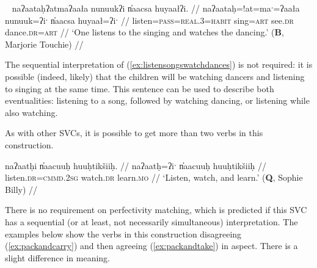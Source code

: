 \ex~ \label{ex:listensongswatchdances}
\begingl
\glpreamble naʔaataḥʔatmaʔaała nunuukʔi n̓aacsa huyaałʔi. //
\gla naʔaataḥ=!at=maˑ=ʔaała nunuuk=ʔiˑ n̓aacsa huyaał=ʔiˑ //
\glb listen=\textsc{pass}=\textsc{real.3}=\textsc{habit} sing=\textsc{art} see.\textsc{dr} dance.\textsc{dr}=\textsc{art} //
\glft `One listens to the singing and watches the dancing.' (\textbf{B}, Marjorie Touchie) //
\endgl
\xe

The sequential interpretation of (\ref{ex:listensongswatchdances}) is not required: it is possible (indeed, likely) that the children will be watching dancers and listening to singing at the same time. This sentence can be used to describe both eventualities: listening to a song, followed by watching dancing, or listening while also watching.

\begin{comment}
It is possible for both verbs in this kind of SVC to share a single direct object. [[Comment: Below be recategorized as Type I?]]

TODO recast the below

\ex \label{ex:listenrespect}
\begingl
\glpreamble naʔaataḥʔaqƛ̓iʔaał ʔiisaak ʔuukʷił ʔaʔiič̓um. //
\gla naʔaataḥ=!aqƛ=!iˑ=ʔaał ʔiisaak ʔu-L.(č)ił ʔaʔiič̓um //
\glb listen.\textsc{dr}=\textsc{fut}=\textsc{cmmd.2sg}=\textsc{habit} respect.\textsc{dr} \textsc{x}-do.to elder.\textsc{pl} //
\glft `Listen to and respect the elders.' (\textbf{C}, \textit{tupaat} Julia Lucas) //
\endgl
\xe


\end{comment}

As with other SVCs, it is possible to get more than two verbs in this construction.

\ex \label{ex:listenwtachlearn}
\begingl
\glpreamble naʔaatḥi n̓aacuuḥ huuḥtikšiiḥ. //
\gla naʔaatḥ=ʔiˑ n̓aacuuḥ huuḥtikšiiḥ //
\glb listen.\textsc{dr}=\textsc{cmmd.2sg} watch.\textsc{dr} learn.\textsc{mo} //
\glft `Listen, watch, and learn.' (\textbf{Q}, Sophie Billy) //
\endgl
\xe

There is no requirement on perfectivity matching, which is predicted if this SVC has a sequential (or at least, not necessarily simultaneous) interpretation. The examples below show the verbs in this construction disagreeing (\ref{ex:packandcarry}) and then agreeing (\ref{ex:packandtake}) in aspect. There is a slight difference in meaning.

